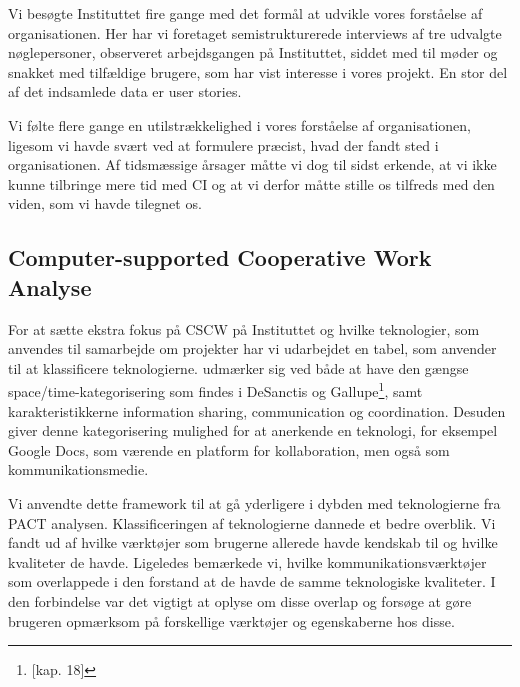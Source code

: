 Vi besøgte Instituttet fire gange med det formål at udvikle vores forståelse af organisationen. Her har vi foretaget semistrukturerede interviews af tre udvalgte nøglepersoner, observeret arbejdsgangen på Instituttet, siddet med til møder og snakket med tilfældige brugere, som har vist interesse i vores projekt. En stor del af det indsamlede data er user stories.

Vi følte flere gange en utilstrækkelighed i vores forståelse af organisationen, ligesom vi havde svært ved at formulere præcist, hvad der fandt sted i organisationen. Af tidsmæssige årsager måtte vi dog til sidst erkende, at vi ikke kunne tilbringe mere tid med CI og at vi derfor måtte stille os tilfreds med den viden, som vi havde tilegnet os. 

\subsection{Computer-supported Cooperative Work Analyse}
For at sætte ekstra fokus på CSCW på Instituttet og hvilke teknologier, som anvendes til samarbejde om projekter har vi udarbejdet en tabel, som anvender \citep{Penichet} til at klassificere teknologierne. \citep{Penichet} udmærker sig ved både at have den gængse space/time-kategorisering som findes i DeSanctis og Gallupe\footnote{\citep{Benyon}[kap. 18]}, samt karakteristikkerne information sharing, communication og coordination. Desuden giver denne kategorisering mulighed for at anerkende en teknologi, for eksempel Google Docs, som værende en platform for kollaboration, men også som kommunikationsmedie. 

Vi anvendte dette framework til at gå yderligere i dybden med teknologierne fra PACT analysen. Klassificeringen af teknologierne dannede et bedre overblik. Vi fandt ud af hvilke værktøjer som brugerne allerede havde kendskab til og hvilke kvaliteter de havde. Ligeledes bemærkede vi, hvilke kommunikationsværktøjer som overlappede i den forstand at de havde de samme teknologiske kvaliteter. I den forbindelse var det vigtigt at oplyse om disse overlap og forsøge at gøre brugeren opmærksom på forskellige værktøjer og egenskaberne hos disse. 


